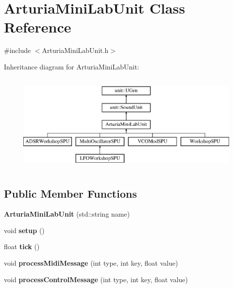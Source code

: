 \hypertarget{classArturiaMiniLabUnit}{\section{Arturia\-Mini\-Lab\-Unit Class Reference}
\label{classArturiaMiniLabUnit}
}


{\ttfamily \#include $<$Arturia\-Mini\-Lab\-Unit.\-h$>$}

Inheritance diagram for Arturia\-Mini\-Lab\-Unit\-:\begin{figure}[H]
\begin{center}
\leavevmode
\includegraphics[height=5.000000cm]{classArturiaMiniLabUnit}
\end{center}
\end{figure}
\subsection*{Public Member Functions}
\begin{DoxyCompactItemize}
\item 
\hypertarget{classArturiaMiniLabUnit_aeb63b33d9631976240fd38d36935b44c}{{\bfseries Arturia\-Mini\-Lab\-Unit} (std\-::string name)}\label{classArturiaMiniLabUnit_aeb63b33d9631976240fd38d36935b44c}

\item 
\hypertarget{classArturiaMiniLabUnit_ae7590bc31683c4dc12b0a1396c53c6b4}{void {\bfseries setup} ()}\label{classArturiaMiniLabUnit_ae7590bc31683c4dc12b0a1396c53c6b4}

\item 
\hypertarget{classArturiaMiniLabUnit_a5d9365ac51fa7f46fdbd53c4f473bfcd}{float {\bfseries tick} ()}\label{classArturiaMiniLabUnit_a5d9365ac51fa7f46fdbd53c4f473bfcd}

\item 
\hypertarget{classArturiaMiniLabUnit_a0bb1d1b81bb3faf7ee141b941cf84457}{void {\bfseries process\-Midi\-Message} (int type, int key, float value)}\label{classArturiaMiniLabUnit_a0bb1d1b81bb3faf7ee141b941cf84457}

\item 
\hypertarget{classArturiaMiniLabUnit_ad8f03d0e1bbe21f115f99c156c0f2d06}{void {\bfseries process\-Control\-Message} (int type, int key, float value)}\label{classArturiaMiniLabUnit_ad8f03d0e1bbe21f115f99c156c0f2d06}

\end{DoxyCompactItemize}
